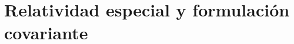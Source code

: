 \documentclass[../main.tex]{subfiles}
\begin{document}
\chapter{Relatividad especial y formulación covariante}

\end{document}
